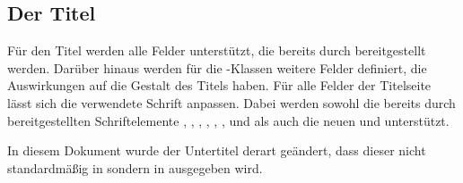 \subsection{Der Titel}
\label{sec:title}
%
Für den Titel werden alle Felder unterstützt, die bereits durch \KOMAScript{} 
bereitgestellt werden. Darüber hinaus werden für die \TUDScript-Klassen weitere 
Felder definiert, die Auswirkungen auf die Gestalt des Titels haben.
Für alle Felder der Titelseite lässt sich die verwendete Schrift anpassen. 
Dabei werden sowohl die bereits durch \KOMAScript{} bereitgestellten 
Schriftelemente , , , 
, , ,  und 
 als auch die neuen  und  
unterstützt.
%
\begin{Example}
In diesem Dokument wurde der Untertitel derart geändert, dass dieser nicht 
standardmäßig in \DIN sondern in  ausgegeben wird.
\begin{Code}[escapechar=§]
\end{Code}
\end{Example}

